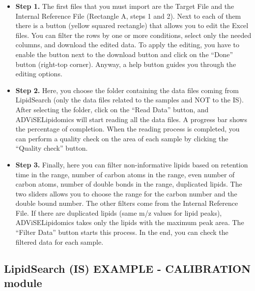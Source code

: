 \documentclass[
]{book}
\providecommand{\tightlist}{%
  \setlength{\itemsep}{0pt}\setlength{\parskip}{0pt}}
\begin{document}
\begin{itemize}
\tightlist
\item
  \textbf{Step 1.} The first files that you must import are the Target File and the Internal Reference File (Rectangle A, steps 1 and 2). Next to each of them there is a button (yellow squared rectangle) that allows you to edit the Excel files. You can filter the rows by one or more conditions, select only the needed columns, and download the edited data. To apply the editing, you have to enable the button next to the download button and click on the ``Done'' button (right-top corner). Anyway, a help button guides you through the editing options.
\item
  \textbf{Step 2.} Here, you choose the folder containing the data files coming from LipidSearch (only the data files related to the samples and NOT to the IS). After selecting the folder, click on the ``Read Data'' button, and ADViSELipidomics will start reading all the data files. A progress bar shows the percentage of completion. When the reading process is completed, you can perform a quality check on the area of each sample by clicking the ``Quality check'' button.
\item
  \textbf{Step 3.} Finally, here you can filter non-informative lipids based on retention time in the range, number of carbon atoms in the range, even number of carbon atoms, number of double bonds in the range, duplicated lipids. The two sliders allows you to choose the range for the carbon number and the double bound number. The other filters come from the Internal Reference File. If there are duplicated lipids (same m/z values for lipid peaks), ADViSELipidomics takes only the lipids with the maximum peak area. The ``Filter Data'' button starts this process. In the end, you can check the filtered data for each sample.
\end{itemize}

\hypertarget{sec322}{%
\subsection{LipidSearch (IS) EXAMPLE - CALIBRATION module}\label{sec322}}
\end{document}

